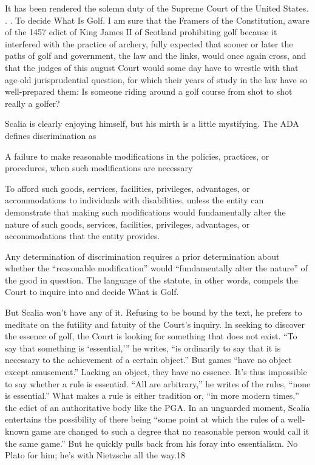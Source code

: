  \par 
It has been rendered the solemn duty of the Supreme Court of the United States. . . To decide What Is Golf. I am sure that the Framers of the Constitution, aware of the 1457 edict of King James II of Scotland prohibiting golf because it interfered with the practice of archery, fully expected that sooner or later the paths of golf and government, the law and the links, would once again cross, and that the judges of this august Court would some day have to wrestle with that age-old jurisprudential question, for which their years of study in the law have so well-prepared them: Is someone riding around a golf course from shot to shot really a golfer?
 \par 
Scalia is clearly enjoying himself, but his mirth is a little mystifying. The ADA defines discrimination as
 \par 
A failure to make reasonable modifications in the policies, practices, or procedures, when such modifications are necessary
 \par 
To afford such goods, services, facilities, privileges, advantages, or accommodations to individuals with disabilities, unless the entity can demonstrate that making such modifications would fundamentally alter the nature of such goods, services, facilities, privileges, advantages, or accommodations that the entity provides.
 \par 
Any determination of discrimination requires a prior determination about whether the “reasonable modification” would “fundamentally alter the nature” of the good in question. The language of the statute, in other words, compels the Court to inquire into and decide What is Golf.
 \par 
But Scalia won’t have any of it. Refusing to be bound by the text, he prefers to meditate on the futility and fatuity of the Court’s inquiry. In seeking to discover the essence of golf, the Court is looking for something that does not exist. “To say that something is ‘essential,’” he writes, “is ordinarily to say that it is necessary to the achievement of a certain object.” But games “have no object except amusement.” Lacking an object, they have no essence. It’s thus impossible to say whether a rule is essential. “All are arbitrary,” he writes of the rules, “none is essential.” What makes a rule is either tradition or, “in more modern times,” the edict of an authoritative body like the PGA. In an unguarded moment, Scalia entertains the possibility of there being “some point at which the rules of a well-known game are changed to such a degree that no reasonable person would call it the same game.” But he quickly pulls back from his foray into essentialism. No Plato for him; he’s with Nietzsche all the way.{\color{blue}18}
